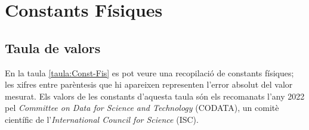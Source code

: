 \chapter{Constants Físiques}\label{sec:const_fis} 

\section{Taula de valors}

En la taula \vref{taula:Const-Fis} es pot veure una recopilació de
constants físiques; les xifres entre parèntesis que hi apareixen representen l'error absolut del valor mesurat. Els valors de les constants d'aquesta taula són els recomanats
l'any 2022 pel \textit{Committee on Data for Science and Technology}
(CODATA), un comitè científic de l'\textit{International Council
for Science} (ISC). 


